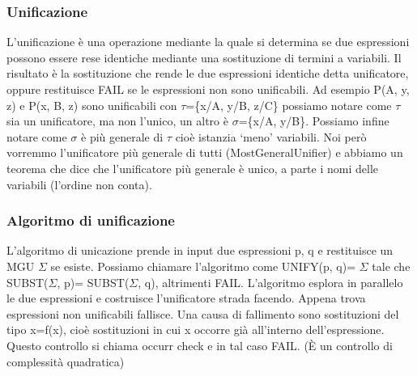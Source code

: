 \documentclass{article}
\begin{document}
\subsubsection{Unificazione}
L'unificazione è una operazione mediante la quale si determina se due espressioni possono essere rese identiche mediante una sostituzione di termini a variabili. Il risultato è la sostituzione che rende le due espressioni identiche detta unificatore, oppure restituisce FAIL se le espressioni non sono unificabili. \newline
Ad esempio P(A, y, z) e P(x, B, z) sono unificabili con $\tau$=\{x/A, y/B, z/C\} possiamo notare come $\tau$ sia un unificatore, ma non l’unico, un altro è $\sigma$=\{x/A, y/B\}. Possiamo infine notare come $\sigma$ è più generale di $\tau$ cioè istanzia ‘meno’ variabili. Noi però vorremmo l’unificatore più generale di tutti (MostGeneralUnifier) e abbiamo un teorema che dice che l’unificatore più generale è unico, a parte i nomi delle variabili (l’ordine non conta).
\subsubsection{Algoritmo di unificazione}
L’algoritmo di unicazione prende in input due espressioni p, q e restituisce un MGU $\Sigma$ se esiste. Possiamo chiamare l'algoritmo come UNIFY(p, q)= $\Sigma$ tale che SUBST($\Sigma$, p)= SUBST($\Sigma$, q), altrimenti FAIL. L’algoritmo esplora in parallelo le due espressioni e costruisce l’unificatore strada facendo. Appena trova espressioni non unificabili fallisce. Una causa di fallimento sono sostituzioni del tipo x=f(x), cioè sostituzioni in cui x occorre già all'interno dell'espressione. Questo controllo si chiama occurr check e in tal caso FAIL. (È un controllo di complessità quadratica)
\end{document}

